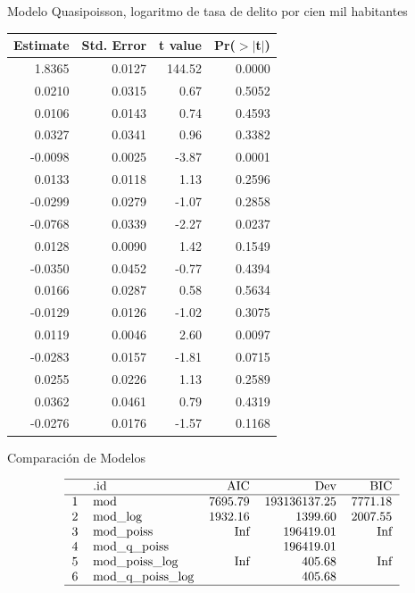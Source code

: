 \documentclass[ignorenonframetext,]{beamer}
\begin{document}
\begin{frame}{Modelo Quasipoisson, logaritmo de tasa de delito por cien
mil habitantes}

\begin{table}[ht]
\centering
{\small
\begin{tabular}{rrrr}
  \hline
Estimate & Std. Error & t value & Pr($>$$|$t$|$) \\ 
  \hline
1.8365 & 0.0127 & 144.52 & 0.0000 \\ 
  0.0210 & 0.0315 & 0.67 & 0.5052 \\ 
  0.0106 & 0.0143 & 0.74 & 0.4593 \\ 
  0.0327 & 0.0341 & 0.96 & 0.3382 \\ 
  -0.0098 & 0.0025 & -3.87 & 0.0001 \\ 
  0.0133 & 0.0118 & 1.13 & 0.2596 \\ 
  -0.0299 & 0.0279 & -1.07 & 0.2858 \\ 
  -0.0768 & 0.0339 & -2.27 & 0.0237 \\ 
  0.0128 & 0.0090 & 1.42 & 0.1549 \\ 
  -0.0350 & 0.0452 & -0.77 & 0.4394 \\ 
  0.0166 & 0.0287 & 0.58 & 0.5634 \\ 
  -0.0129 & 0.0126 & -1.02 & 0.3075 \\ 
  0.0119 & 0.0046 & 2.60 & 0.0097 \\ 
  -0.0283 & 0.0157 & -1.81 & 0.0715 \\ 
  0.0255 & 0.0226 & 1.13 & 0.2589 \\ 
  0.0362 & 0.0461 & 0.79 & 0.4319 \\ 
  -0.0276 & 0.0176 & -1.57 & 0.1168 \\ 
   \hline
\end{tabular}
}
\end{table}

\end{frame}

\begin{frame}{Comparación de Modelos}

\[ \begin{tabular}{rlrrr}
  \hline
 & .id & AIC & Dev & BIC \\ 
  \hline
1 & mod & 7695.79 & 193136137.25 & 7771.18 \\ 
  2 & mod\_log & 1932.16 & 1399.60 & 2007.55 \\ 
  3 & mod\_poiss & Inf & 196419.01 & Inf \\ 
  4 & mod\_q\_poiss &  & 196419.01 &  \\ 
  5 & mod\_poiss\_log & Inf & 405.68 & Inf \\ 
  6 & mod\_q\_poiss\_log &  & 405.68 &  \\ 
   \hline
\end{tabular} \]

\end{frame}
\end{document}
